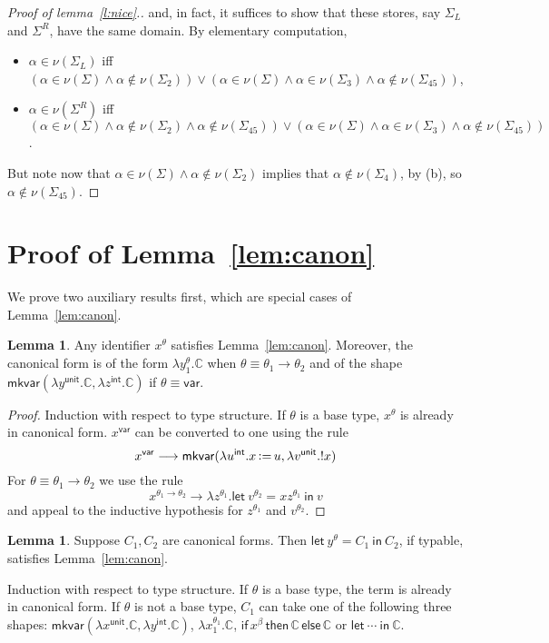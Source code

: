 \documentclass{CSML}
\theoremstyle{definition}\newtheorem{definition}[thm]{Definition}
\theoremstyle{definition}\newtheorem{example}[thm]{Example}
\theoremstyle{definition}\newtheorem{proposition}[thm]{Proposition}
\theoremstyle{definition}\newtheorem{lemma}[thm]{Lemma}
\theoremstyle{definition}\newtheorem{theorem}[thm]{Theorem}
\theoremstyle{definition}\newtheorem{corollary}[thm]{Corollary}
\theoremstyle{definition}\newtheorem{remark}[thm]{Remark}
\renewcommand\Sigma{\varSigma}
\newcommand\lrarr\longrightarrow
\newcommand\letin[2]{\mathsf{let}\ #1\ \mathsf{in}\ #2}
\newcommand\badvar[2]{\mathsf{mkvar}(#1,#2)}
\newcommand{\aasg}{\,\raisebox{0.065ex}{:}{=}\,}
\newcommand\comt{\mathsf{unit}}
\newcommand\expt{\mathsf{int}}
\newcommand\vart{\mathsf{var}}
\newcommand\cond[3]{\mathsf{if}\,#1\,\mathsf{then}\,#2\,\mathsf{else}\,#3}
\newcommand{\rarr}{\rightarrow}
\newcommand\na\alpha
\newcommand\can{\mathbb{C}}
\begin{document}
\begin{proof}[Proof of lemma~\ref{l:nice}.]
and, in fact, it suffices to show that these stores, say $\Sigma_L$ and $\Sigma^R$, have the same domain. By elementary computation,
\begin{itemize}
\item $\na\in\nu(\Sigma_L)$ iff $(\na\in\nu(\Sigma)\land\na\notin\nu(\Sigma_2))\lor (\na\in\nu(\Sigma)\land\na\in\nu(\Sigma_3)\land\na\notin\nu(\Sigma_{45}))$,
\item $\na\in\nu(\Sigma^R)$ iff $(\na\in\nu(\Sigma)\land\na\notin\nu(\Sigma_2)\land\na\notin\nu(\Sigma_{45}))\lor (\na\in\nu(\Sigma)\land\na\in\nu(\Sigma_3)\land\na\notin\nu(\Sigma_{45}))$.
\end{itemize}
But note now that $\na\in\nu(\Sigma)\land\na\notin\nu(\Sigma_2)$ implies that $\na\notin\nu(\Sigma_{4})$, by (b), so $\na\notin\nu(\Sigma_{45})$.
\end{proof}





\section{Proof of Lemma~\ref{lem:canon}\label{apx:canon}}


We prove two auxiliary results first, which are special cases of Lemma~\ref{lem:canon}.

\begin{lemma}\label{lem:var}
Any identifier $x^\theta$ satisfies Lemma~\ref{lem:canon}. Moreover, the canonical 
form is of the form $\lambda y^\theta_1.\can$ when $\theta\equiv\theta_1\rarr\theta_2$
and of the shape  $\badvar{\lambda y^\comt.\can}{\lambda z^\expt.\can}$ if $\theta\equiv\vart$.
\end{lemma}
\begin{proof} 
Induction with respect to type structure. If $\theta$ is a base type, $x^\theta$ is already in canonical
form.  $x^\vart$ can be converted to one using the rule
\[
x^\vart  \lrarr  \badvar{\lambda u^\expt. x\aasg u}{\lambda v^\comt.!x}
\]
For $\theta\equiv\theta_1\rarr\theta_2$ we use the rule
\[
x^{\theta_1\rarr\theta_2} \lrarr \lambda z^{\theta_1}. \letin{v^{\theta_2}=xz^{\theta_1}}{v} 
\]
and appeal to the inductive hypothesis for $z^{\theta_1}$ and $v^{\theta_2}$.
\end{proof}

\begin{lemma}\label{lem:let}
Suppose $C_1, C_2$ are canonical forms. Then $\letin{y^\theta=C_1}{C_2}$, if typable,
satisfies Lemma~\ref{lem:canon}.
\end{lemma}
\proof
Induction with respect to type structure. If $\theta$ is a base type, the term is already
in canonical form. If $\theta$ is not a base type, $C_1$ can take one of the following
three shapes: $\badvar{\lambda x^\comt.\can}{\lambda y^\expt.\can}$,  $\lambda x_1^{\theta_1}.\can$,
$\cond{x^\beta}{\can}{\can}$ or $\letin{\cdots}{\can}$.
\end{document}
